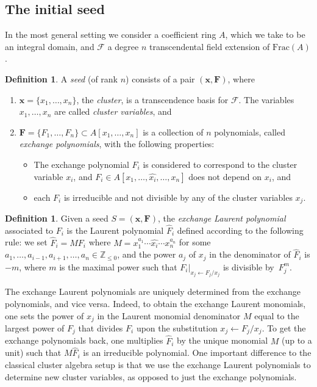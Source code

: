 \documentclass[10pt,a4paper]{amsart}
\numberwithin{equation}{section}
\theoremstyle{definition}
\newtheorem{defn}[thm]{Definition}
\begin{document}
\subsection{The initial seed}

In the most general setting we consider a coefficient ring $A$, which we take to be an integral domain, and $\mathcal{F}$ a degree $n$ transcendental field extension of $\text{Frac}(A)$.

\begin{defn}
	A \textit{seed} (of rank $n$) consists of a pair $(\bm{x}, \bm{F})$, where
	\begin{enumerate}\itemsep=0pt
		\item[(1)] $\bm{x} = \{x_1, \dots, x_n\}$, the \textit{cluster}, is a transcendence basis for $\mathcal{F}$. The variables $x_1, \dots, x_n$ are called \textit{cluster variables}, and
		\item[(2)] $\bm{F} = \{F_1, \dots, F_n\} \subset A[x_1, \dots, x_n]$ is a collection of $n$ polynomials, called \textit{exchange polynomials}, with the following properties:
		\begin{itemize}\itemsep=0pt
			\item[(LP1)] The exchange polynomial $F_i$ is considered to correspond to the cluster variable $x_i$, and $F_i\in A[x_1, \dots, \widehat{x_i}, \dots, x_n]$ does not depend on $x_i$, and
			\item[(LP2)] each $F_i$ is irreducible and not divisible by any of the cluster variables $x_j$.
		\end{itemize}
	\end{enumerate}
\end{defn}

\begin{defn}\label{def!exchange-laurent-poly}
Given a seed $S = (\bm{x}, \bm{F})$, the \textit{exchange Laurent polynomial} associated to $F_i$ is the Laurent polynomial $\hat{F}_i$ defined according to the following rule: we set $\hat{F}_i = M F_i$ where ${M = x_1^{a_1} \cdots \widehat{x_i} \cdots x_n^{a_n}}$ for some $a_1, \dots , a_{i-1}, a_{i+1}, \dots , a_n \in \mathbb{Z}_{\leq 0}$, and the power $a_j$ of $x_j$ in the denominator of $\hat{F}_i$ is $-m$, where $m$ is the maximal power such that $F_{i} |_{x_j \leftarrow F_j/x_j}$ is divisible by~$F_j^m$.
\end{defn}

The exchange Laurent polynomials are uniquely determined from the exchange polynomials, and vice versa. Indeed, to obtain the exchange Laurent monomials, one sets the power of $x_j$ in the Laurent monomial denominator $M$ equal to the largest power of $F_j$ that divides $F_i$ upon the substitution $x_j \leftarrow F_j / x_j$. To get the exchange polynomials back, one multiplies $\hat{F}_i$ by the unique monomial $M$ (up to a unit) such that $M\hat{F}_i$ is an irreducible polynomial. One important difference to the classical cluster algebra setup is that we use the exchange Laurent polynomials to determine new cluster variables, as opposed to just the exchange polynomials.
\end{document}

